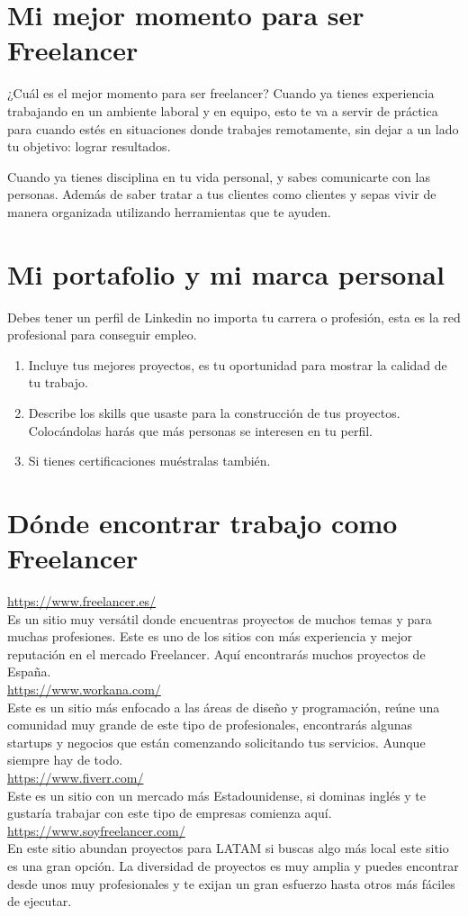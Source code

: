 \documentclass{article}
\begin{document}
\section{Mi mejor momento para ser Freelancer}
    ¿Cuál es el mejor momento para ser freelancer?
    Cuando ya tienes experiencia trabajando en un ambiente laboral y en equipo, esto te va a servir de práctica para cuando estés en situaciones donde trabajes remotamente, sin dejar a un lado tu objetivo: lograr resultados.
    
    Cuando ya tienes disciplina en tu vida personal, y sabes comunicarte con las personas. Además de saber tratar a tus clientes como clientes y sepas vivir de manera organizada utilizando herramientas que te ayuden.
\section{Mi portafolio y mi marca personal}

    Debes tener un perfil de Linkedin no importa tu carrera o profesión, esta es la red profesional para conseguir empleo.
    \begin{enumerate}
        \item Incluye tus mejores proyectos, es tu oportunidad para mostrar la calidad de tu trabajo.
    
        \item Describe los skills que usaste para la construcción de tus proyectos. Colocándolas harás que más personas se interesen en tu perfil.
    
        \item Si tienes certificaciones muéstralas también.
    \end{enumerate}

\section{Dónde encontrar trabajo como Freelancer}
    \url{https://www.freelancer.es/}\\
    Es un sitio muy versátil donde encuentras proyectos de muchos temas y para muchas profesiones. Este es uno de los sitios con más experiencia y mejor reputación en el mercado Freelancer. Aquí encontrarás muchos proyectos de España.\\
    \url{https://www.workana.com/}\\
    Este es un sitio más enfocado a las áreas de diseño y programación, reúne una comunidad muy grande de este tipo de profesionales, encontrarás algunas startups y negocios que están comenzando solicitando tus servicios. Aunque siempre hay de todo.\\
    \url{https://www.fiverr.com/}\\
    Este es un sitio con un mercado más Estadounidense, si dominas inglés y te gustaría trabajar con este tipo de empresas comienza aquí.\\
    \url{https://www.soyfreelancer.com/}\\
    En este sitio abundan proyectos para LATAM si buscas algo más local este sitio es una gran opción. La diversidad de proyectos es muy amplia y puedes encontrar desde unos muy profesionales y te exijan un gran esfuerzo hasta otros más fáciles de ejecutar.
\end{document}
